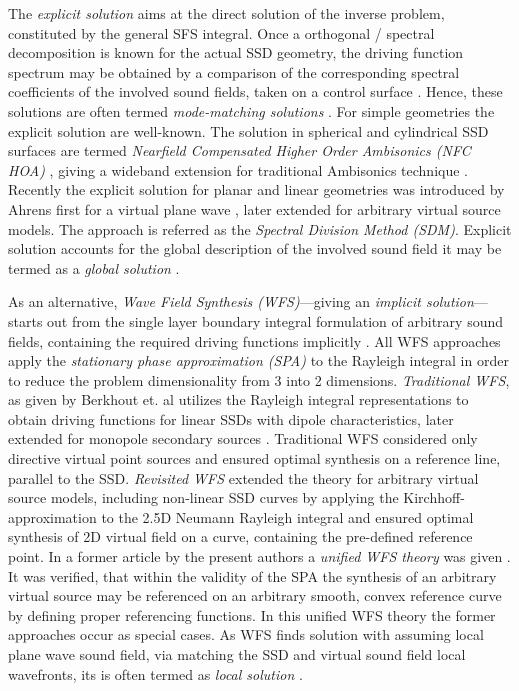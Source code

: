 \documentclass[journal]{IEEEtran}
\begin{document}
The \emph{explicit solution} aims at the direct solution of the inverse problem, constituted by the general SFS integral. 
Once a orthogonal / spectral decomposition is known for the actual SSD geometry, the driving function spectrum may be obtained by a comparison of the corresponding spectral coefficients of the involved sound fields, taken on a control surface \cite{Ahrens2010phd}.
Hence, these solutions are often termed \emph{mode-matching solutions} \cite{Fazi2010}.
For simple geometries the explicit solution are well-known.
The solution in spherical and cylindrical SSD surfaces are termed \emph{Nearfield Compensated Higher Order Ambisonics (NFC HOA)} \cite{Ahrens2009:circular25D_SFR,Ahrens2008:Analytical_Circ_Spherical_SFS,Poletti2005,Zotter2009phd}, giving a wideband extension for  traditional Ambisonics technique \cite{Gerzon1973}.
Recently the explicit solution for planar and linear geometries was introduced by Ahrens first for a virtual plane wave \cite{Ahrens2008_SDMInit,Ahrens2010a,Ahrens2012:Ambisonics_for_planar_linear}, later extended for arbitrary virtual source models.
The approach is referred as the \emph{Spectral Division Method (SDM)}.
Explicit solution accounts for the global description of the involved sound field it may be termed as a \emph{global solution} \cite{Ahrens2012}.

As an alternative, \emph{Wave Field Synthesis (WFS)}---giving an \emph{implicit solution}---starts out from the single layer boundary integral formulation of arbitrary sound fields, containing the required driving functions implicitly \cite{Vries2009}.
All WFS approaches apply the \emph{stationary phase approximation (SPA)} to the Rayleigh integral in order to reduce the problem dimensionality from 3 into 2 dimensions.
\emph{Traditional WFS}, as given by Berkhout et. al \cite{Berkhout1988,Berkhout1993:Acoustic_control_by_WFS} utilizes the Rayleigh integral representations to obtain driving functions for linear SSDs with dipole characteristics, later extended for monopole secondary sources \cite{Vogel1993:phd,Start1997:phd,Verheijen1997:phd}. 
Traditional WFS considered only directive virtual point sources and ensured optimal synthesis on a reference line, parallel to the SSD. 
\emph{Revisited WFS} \cite{Spors2008:WFSrevisited} extended the theory for arbitrary virtual source models, including non-linear SSD curves by applying the Kirchhoff-approximation to the 2.5D Neumann Rayleigh integral and ensured optimal synthesis of 2D virtual field on a curve, containing the pre-defined reference point.
In a former article by the present authors a \emph{unified WFS theory} was given \cite{Firtha2016:UnifiedWFS}.
It was verified, that within the validity of the SPA the synthesis of an arbitrary virtual source may be referenced on an arbitrary smooth, convex reference curve by defining proper referencing functions.
In this unified WFS theory the former approaches occur as special cases. As WFS finds solution with assuming local plane wave sound field, via matching the SSD and virtual sound field local wavefronts, its is often termed as \emph{local solution} \cite{Ahrens2012}.
\end{document}
